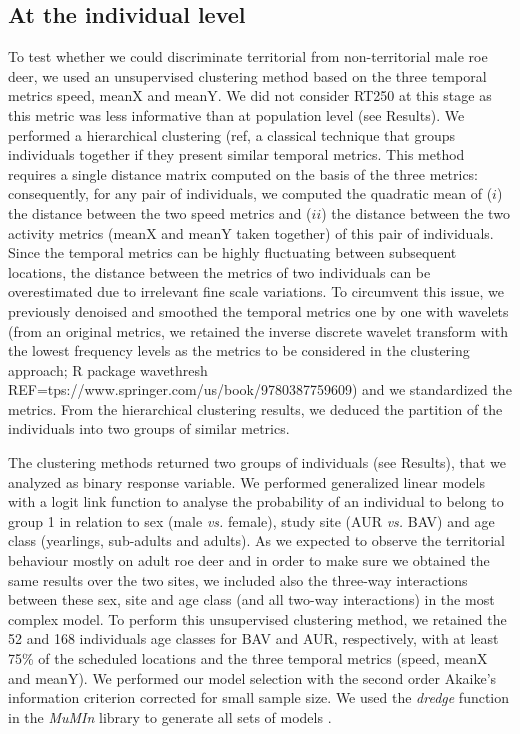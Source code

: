 \documentclass[a4paper,11pt]{article}
\newcommand{\nico}[1]{\todo[backgroundcolor=red!25,bordercolor=red]{\small #1}}
\begin{document}
\subsection*{At the individual level}
To test whether we could discriminate territorial from non-territorial
male roe deer, we used an unsupervised clustering method based on the
three temporal metrics speed, meanX and meanY. We did not consider
RT250 at this stage as this metric was less informative than at
population level (see Results). We performed a hierarchical clustering
(ref\nico{Vincent?}, a classical technique that groups individuals together if they
present similar temporal metrics. This method requires a single
distance matrix computed on the basis of the three metrics:
consequently, for any pair of individuals, we computed the quadratic
mean of ($i$) the distance between the two speed metrics and ($ii$)
the distance between the two activity metrics (meanX and meanY taken
together) of this pair of individuals. Since the temporal metrics can
be highly fluctuating between subsequent locations, the distance
between the metrics of two individuals can be overestimated due to
irrelevant fine scale variations. To circumvent this issue, we
previously denoised and smoothed the temporal metrics one by one with
wavelets (from an original metrics, we retained the inverse discrete
wavelet transform with the lowest frequency levels as the metrics to
be considered in the clustering approach; R package
\textsf{wavethresh} REF=tps://www.springer.com/us/book/9780387759609)
and we standardized the metrics. From the hierarchical clustering
results, we deduced the partition of the individuals into two groups
of similar metrics.

The clustering methods returned two groups of individuals (see
Results), that we analyzed as binary response variable. We performed
generalized linear models with a logit link function to analyse the
probability of an individual to belong to group 1 in relation to sex
(male \textit{vs.} female), study site (AUR \textit{vs.} BAV) and age
class (yearlings, sub-adults and adults). As we expected to observe
the territorial behaviour mostly on adult roe deer and in order to
make sure we obtained the same results over the two sites, we included
also the three-way interactions between these sex, site and age class
(and all two-way interactions) in the most complex model. To perform
this unsupervised clustering method, we retained the 52 and 168
individuals age classes for BAV and AUR, respectively, with at least
75\% of the scheduled locations and the three temporal metrics (speed,
meanX and meanY). We performed our model selection with the second
order Akaike’s information criterion corrected for small sample
size. We used the \textit{dredge} function in the \textit{MuMIn}
library to generate all sets of models \citep{barton_mumin:_2016}.
\end{document}
